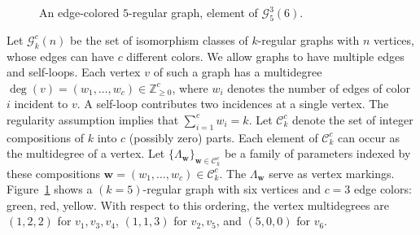 \documentclass[a4paper,oneside]{amsart}
\newcommand{\bb}[1]{\boldsymbol{#1}}
\numberwithin{theorem}{section}
\theoremstyle{remark}
\newcommand{\Z}{\mathbb{Z}}
\begin{document}
\begin{figure}[ht]
    \caption{An edge-colored $5$-regular graph, element of $\mathcal{G}_5^3(6)$.}
    \label{fig:graph_intro}
\end{figure}
Let $\mathcal G_k^c(n)$ be the set of isomorphism classes of $k$-regular graphs with $n$ vertices, whose edges can have $c$ different colors. We allow graphs to have multiple edges and self-loops. Each vertex $v$ of such a graph has a multidegree $\deg(v) = (w_1,\ldots,w_c) \in \Z_{\geq 0}^c$, where $w_i$ denotes the number of edges of color $i$ incident to $v$. A self-loop contributes two incidences at a single vertex. The regularity assumption implies that $\sum_{i=1}^c w_i = k$. Let $\mathcal C_k^c$ denote the set of integer compositions of $k$ into $c$ (possibly zero) parts. Each  element of $\mathcal C_k^c$ can occur as the multidegree of a vertex. 
Let $\{\Lambda_{\bb w}\}_{\bb w \in \mathcal C_k^c}$ be a family of parameters indexed by these compositions $\bb w = (w_1,\ldots,w_c) \in \mathcal C_k^c$.
The $\Lambda_{\bb{w}}$ serve as vertex markings.
Figure~\ref{fig:graph_intro} shows a $(k\!=\!5)$-regular graph with six vertices and $c=3$ edge colors: green, red, yellow. With respect to this ordering, the vertex multidegrees are  $(1,2,2)$ for $v_1, v_3, v_4$, $(1,1,3)$ for $v_2, v_5$, and $(5,0,0)$ for $v_6$.\par
\end{document}
